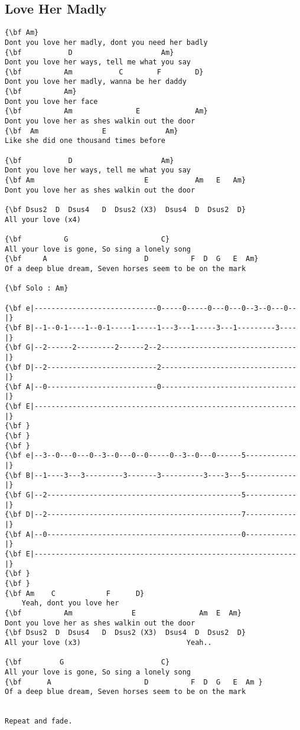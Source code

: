 \documentclass[a4paper]{article}
\begin{document}
\subsection{Love Her Madly} %
\label{sub:Love Her Madly}
\begin{Verbatim}[commandchars=\\\{\}]
{\bf Am}
Dont you love her madly, dont you need her badly
{\bf           D                     Am}
Dont you love her ways, tell me what you say
{\bf          Am           C        F        D}
Dont you love her madly, wanna be her daddy
{\bf          Am}
Dont you love her face
{\bf          Am               E             Am}
Dont you love her as shes walkin out the door
{\bf  Am               E              Am}
Like she did one thousand times before

{\bf           D                     Am}
Dont you love her ways, tell me what you say
{\bf Am                          E           Am   E   Am}
Dont you love her as shes walkin out the door

{\bf Dsus2  D  Dsus4   D  Dsus2 (X3)  Dsus4  D  Dsus2  D}
All your love (x4)

{\bf          G                      C}
All your love is gone, So sing a lonely song
{\bf     A                       D          F  D  G   E  Am}
Of a deep blue dream, Seven horses seem to be on the mark

{\bf Solo : Am}

{\bf e|-----------------------------0-----0-----0---0---0--3--0---0--|}
{\bf B|--1--0-1----1--0-1-----1-----1---3---1-----3---1---------3----|}
{\bf G|--2------2---------2------2--2--------------------------------|}
{\bf D|--2--------------------------2--------------------------------|}
{\bf A|--0--------------------------0--------------------------------|}
{\bf E|--------------------------------------------------------------|}
{\bf }
{\bf }
{\bf }
{\bf e|--3--0---0---0--3--0---0--0-----0--3--0---0------5------------|}
{\bf B|--1----3---3---------3-------3----------3----3---5------------|}
{\bf G|--2----------------------------------------------5------------|}
{\bf D|--2----------------------------------------------7------------|}
{\bf A|--0----------------------------------------------0------------|}
{\bf E|--------------------------------------------------------------|}
{\bf }
{\bf }
{\bf Am    C            F      D}
    Yeah, dont you love her
{\bf          Am              E               Am  E  Am}
Dont you love her as shes walkin out the door
{\bf Dsus2  D  Dsus4   D  Dsus2 (X3)  Dsus4  D  Dsus2  D}
All your love (x3)                         Yeah..                      

{\bf         G                       C}
All your love is gone, So sing a lonely song
{\bf      A                      D          F  D  G   E  Am }
Of a deep blue dream, Seven horses seem to be on the mark


Repeat and fade. 
\end{Verbatim}
\newpage
\end{document}
